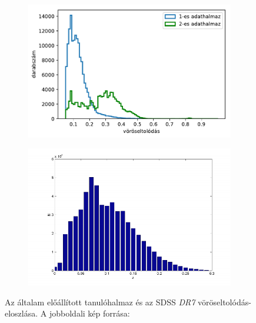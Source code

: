 \documentclass[12pt,letterpaper,twoside,openright]{book}
\begin{document}
 \begin{figure}[h!]
 \centering
  \begin{subfigure}[b]{0.35\textwidth}
    \includegraphics[width=\textwidth, height = \textwidth]{Figures/hists.pdf}
    \label{fig:1}
  \end{subfigure}
  \hspace{2cm}
  \begin{subfigure}[b]{0.35\textwidth}
    \includegraphics[width=\textwidth, height = 1.05\textwidth]{Figures/rsd.png}
    \label{fig:2}
  \end{subfigure}
  \caption{Az általam előállított tanulóhalmaz és az SDSS \textit{DR7} vöröseltolódás-eloszlása. A jobboldali kép forrása: \cite{rsd}}
  \label{fig:dist}
 \end{figure}
\end{document}
